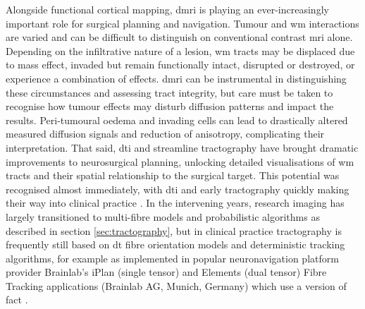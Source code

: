 Alongside functional cortical mapping, \gls{dmri} is playing an ever-increasingly important role for surgical planning and navigation.
Tumour and \gls{wm} interactions are varied and can be difficult to distinguish on conventional contrast \gls{mri} alone.
Depending on the infiltrative nature of a lesion, \gls{wm} tracts may be displaced due to mass effect, invaded but remain functionally intact, disrupted or destroyed, or experience a combination of effects\autocite{Essayed2017,DSouza2019,Manan2023}.
\gls{dmri} can be instrumental in distinguishing these circumstances and assessing tract integrity\autocite{Field2004,Manan2023}, but care must be taken to recognise how tumour effects may disturb diffusion patterns and impact the results.
Peri-tumoural oedema and invading cells can lead to drastically altered measured diffusion signals and reduction of anisotropy, complicating their interpretation\autocite{Kuhnt2013}.
That said, \gls{dti} and streamline tractography have brought dramatic improvements to neurosurgical planning, unlocking detailed visualisations of \gls{wm} tracts and their spatial relationship to the surgical target.
This potential was recognised almost immediately, with \gls{dti} and early tractography quickly making their way into clinical practice \autocite{Lee2001,Mori2002a,Nimsky2005}.
In the intervening years, research imaging has largely transitioned to multi-fibre models and probabilistic algorithms as described in section \ref{sec:tractography}, but in clinical practice tractography is frequently still based on \gls{dt} fibre orientation models \autocite{Toescu2020, Yang2021} and deterministic tracking algorithms,
for example as implemented in popular neuronavigation platform provider Brainlab's iPlan\textregistered{} (single tensor)\autocite{Brainlab2012} and Elements (dual tensor)\autocite{Sollmann2020a} Fibre Tracking applications (Brainlab AG, Munich, Germany) which use a version of \gls{fact} \autocite{Mori1999}.

